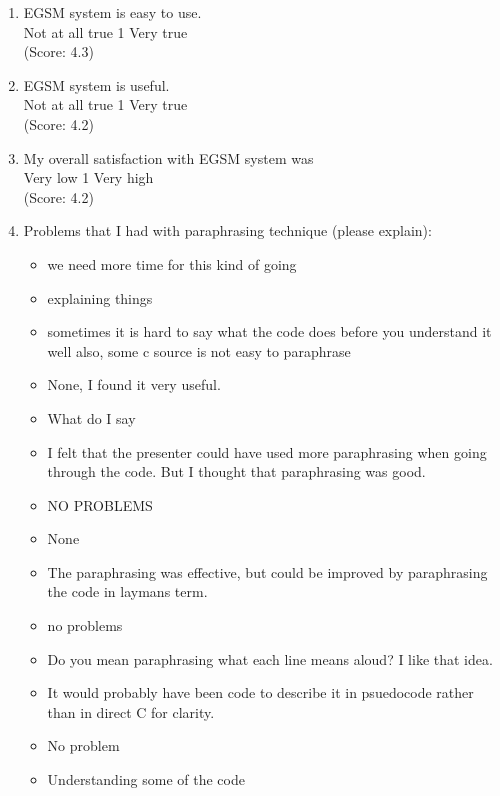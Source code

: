 \begin{enumerate}
\item EGSM system is easy to use.
\\
Not at all true \hfill 1     \hfill Very true\\
(Score: 4.3)


\item EGSM system is useful.
\\
Not at all true \hfill 1     \hfill Very true\\
(Score: 4.2)

\item My overall satisfaction with EGSM system was
\\
Very low \hfill 1     \hfill Very high\\
(Score: 4.2)

\item Problems that I had with paraphrasing technique (please
explain):
\begin{itemize}
\item we need more time for this kind of going
\item explaining things 


\item sometimes it is hard to say what the code does before you understand
it well
also, some c source is not easy to paraphrase

\item None, I found it very useful.
\item What do I say
\item I felt that the presenter could have used more paraphrasing when going
through the code.
But I thought that paraphrasing was good.

\item NO PROBLEMS
\item None
\item The paraphrasing was effective, but could be improved by paraphrasing
the code in laymans term.





\item no problems
\item Do you mean paraphrasing what each line means aloud?  I like that idea.

\item It would probably have been code to describe it in psuedocode rather
than in direct C for clarity.
\item No problem
\item Understanding some of the code
\end{itemize}


\end{enumerate}
